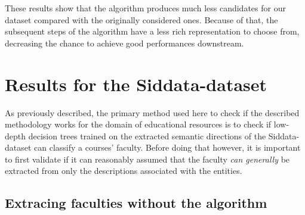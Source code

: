 These results show that the algorithm produces much less candidates for our dataset compared with the originally considered ones. Because of that, the subsequent steps of the algorithm have a less rich representation to choose from, decreasing the chance to achieve good performances downstream.

\section{Results for the Siddata-dataset}
\label{sec:results_siddata}


As previously described, the primary method used here to check if the described methodology works for the domain of educational resources is to check if low-depth decision trees trained on the extracted semantic directions of the Siddata-dataset can classify a courses' faculty. Before doing that however, it is important to first validate if it can reasonably assumed that the faculty \textit{can generally} be extracted from only the descriptions associated with the entities.

\subsection*{Extracing faculties without the algorithm}


